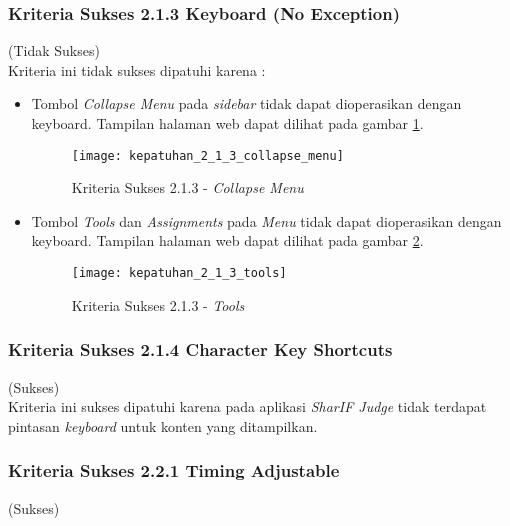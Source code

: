 \subsubsection{Kriteria Sukses 2.1.3 Keyboard (No Exception)}
\label{subsubsec:kepatuhan_kriteria_2.1.3}
(Tidak Sukses) \\

Kriteria ini tidak sukses dipatuhi karena :
\begin{itemize}
	\item Tombol \textit{Collapse Menu} pada \textit{sidebar} tidak dapat dioperasikan dengan keyboard. Tampilan halaman web dapat dilihat pada gambar \ref{fig:kepatuhan_2_1_3_collapse_menu}.
	\begin{figure}[H]
		\centering  
		\texttt{[image: kepatuhan\_2\_1\_3\_collapse\_menu]}  
		\caption[Kriteria Sukses 2.1.3 - \textit{Collapse Menu}]{Kriteria Sukses 2.1.3 - \textit{Collapse Menu}} 
		\label{fig:kepatuhan_2_1_3_collapse_menu} 
	\end{figure}

	\item Tombol \textit{Tools} dan \textit{Assignments} pada \textit{Menu} tidak dapat dioperasikan dengan keyboard. Tampilan halaman web dapat dilihat pada gambar \ref{fig:kepatuhan_2_1_3_tools}.
	\begin{figure}[H]
		\centering  
		\texttt{[image: kepatuhan\_2\_1\_3\_tools]}  
		\caption[Kriteria Sukses 2.1.3 - \textit{Tools}]{Kriteria Sukses 2.1.3 - \textit{Tools}} 
		\label{fig:kepatuhan_2_1_3_tools} 
	\end{figure}

\end{itemize}

\subsubsection{Kriteria Sukses 2.1.4 Character Key Shortcuts}
\label{subsubsec:kepatuhan_kriteria_2.1.4}
(Sukses) \\

Kriteria ini sukses dipatuhi karena pada aplikasi \textit{SharIF Judge} tidak terdapat pintasan \textit{keyboard} untuk konten yang ditampilkan.

\subsubsection{Kriteria Sukses 2.2.1 Timing Adjustable}
\label{subsubsec:kepatuhan_kriteria_2.2.1}
(Sukses) \\

